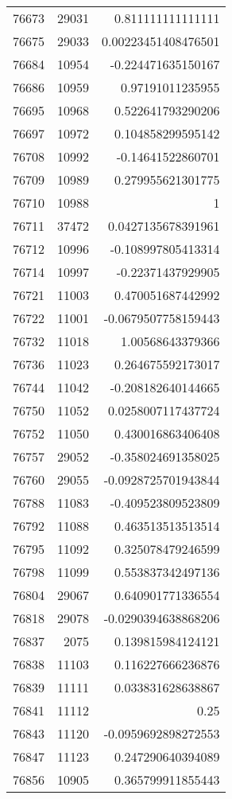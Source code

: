 \begin{tabular}{r | r | r}
76673 & 29031 & 0.811111111111111 \\
76675 & 29033 & 0.00223451408476501 \\
76684 & 10954 & -0.224471635150167 \\
76686 & 10959 & 0.97191011235955 \\
76695 & 10968 & 0.522641793290206 \\
76697 & 10972 & 0.104858299595142 \\
76708 & 10992 & -0.14641522860701 \\
76709 & 10989 & 0.279955621301775 \\
76710 & 10988 & 1 \\
76711 & 37472 & 0.0427135678391961 \\
76712 & 10996 & -0.108997805413314 \\
76714 & 10997 & -0.22371437929905 \\
76721 & 11003 & 0.470051687442992 \\
76722 & 11001 & -0.0679507758159443 \\
76732 & 11018 & 1.00568643379366 \\
76736 & 11023 & 0.264675592173017 \\
76744 & 11042 & -0.208182640144665 \\
76750 & 11052 & 0.0258007117437724 \\
76752 & 11050 & 0.430016863406408 \\
76757 & 29052 & -0.358024691358025 \\
76760 & 29055 & -0.0928725701943844 \\
76788 & 11083 & -0.409523809523809 \\
76792 & 11088 & 0.463513513513514 \\
76795 & 11092 & 0.325078479246599 \\
76798 & 11099 & 0.553837342497136 \\
76804 & 29067 & 0.640901771336554 \\
76818 & 29078 & -0.0290394638868206 \\
76837 & 2075 & 0.139815984124121 \\
76838 & 11103 & 0.116227666236876 \\
76839 & 11111 & 0.033831628638867 \\
76841 & 11112 & 0.25 \\
76843 & 11120 & -0.0959692898272553 \\
76847 & 11123 & 0.247290640394089 \\
76856 & 10905 & 0.365799911855443 \\

\end{tabular}

